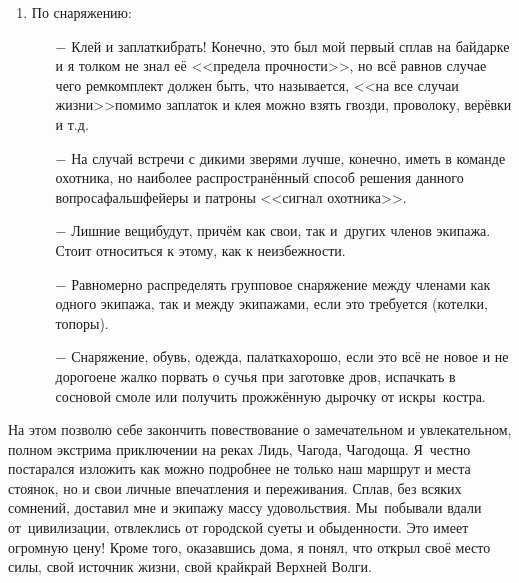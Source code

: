 \begin{enumerate}
		\begin{enumerate}
		\setlength{\itemindent}{0em}
		\item [$-$] С особой тщательностью следует подбирать экипажи и только в самых крайних случаях идти с~малознакомыми людьми. Про незнакомых я вообще молчу\mdash этого, по возможности, следует избегать. Исключение\mdash всякие коммерческие сплавы.
		\item [$-$] На трёхместных байдарках физически сильных гребцов следует размещать на корме и носу\mdash так проще управлять байдаркой и совершать маневрирование. 
	\end{enumerate}
	\item По снаряжению:
	\begin{enumerate}
		\setlength{\itemindent}{0em}
		\item [$-$] Клей и заплатки\mdash брать! Конечно, это был мой первый сплав на байдарке и я толком не знал её <<предела прочности>>, но всё равно\mdash в случае чего ремкомплект должен быть, что называется, <<на все случаи жизни>>\mdash помимо заплаток и клея можно взять гвозди, проволоку, верёвки и т.д.
		\item [$-$] На случай встречи с дикими зверями лучше, конечно, иметь в команде охотника, но наиболее распространённый способ решения данного вопроса\mdash фальшфейеры и патроны <<сигнал охотника>>.
		\item [$-$] Лишние вещи\mdash будут, причём как свои, так и~других членов экипажа. Стоит относиться к этому, как к неизбежности.
		\item [$-$] Равномерно распределять групповое снаряжение между членами как одного экипажа, так и между экипажами, если это требуется (котелки, топоры).
		\item [$-$] Снаряжение, обувь, одежда, палатка\mdash хорошо, если это всё не новое и не дорогое\mdash не жалко порвать о сучья при заготовке дров, испачкать в сосновой смоле или получить прожжённую дырочку от искры~костра.
	\end{enumerate}
\end{enumerate}

На этом позволю себе закончить повествование о замечательном и увлекательном, полном экстрима приключении на реках Лидь, Чагода, Чагодоща. Я~честно постарался изложить как можно подробнее не только наш маршрут и места стоянок, но и свои личные впечатления и переживания. Сплав, без всяких сомнений, доставил мне и экипажу массу удовольствия. Мы~побывали вдали от~цивилизации, отвлеклись от городской суеты и обыденности. Это имеет огромную цену! Кроме того, оказавшись дома, я понял, что открыл своё место силы, свой источник жизни, свой край\mdash край Верхней Волги.

